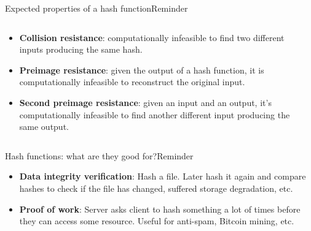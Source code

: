\documentclass[aspectratio=169, lualatex, handout]{beamer}
\begin{document}
\begin{frame}{Expected properties of a hash function}{Reminder}
	\begin{columns}[c]
		\begin{column}{0.6\textwidth}
			\begin{itemize}
				\item \textbf{Collision resistance}: computationally infeasible to find
				      two different inputs producing the same hash.
				\item \textbf{Preimage resistance}: given the output of a hash function,
				      it is computationally infeasible to reconstruct the original input.
				\item \textbf{Second preimage resistance}: given an input and an output,
				      it's computationally infeasible to find another different input
				      producing the same output.
			\end{itemize}
		\end{column}
		\begin{column}{0.4\textwidth}
		\end{column}
	\end{columns}
\end{frame}

\begin{frame}{Hash functions: what are they good for?}{Reminder}
	\begin{itemize}
		\item \textbf{Data integrity verification}: Hash a file. Later hash it
		      again and compare hashes to check if the file has changed, suffered storage
		      degradation, etc.
		\item \textbf{Proof of work}: Server asks client to hash something a lot of
		      times before they can access some resource. Useful for anti-spam, Bitcoin
		      mining, etc.
	\end{itemize}
\end{frame}
\end{document}
